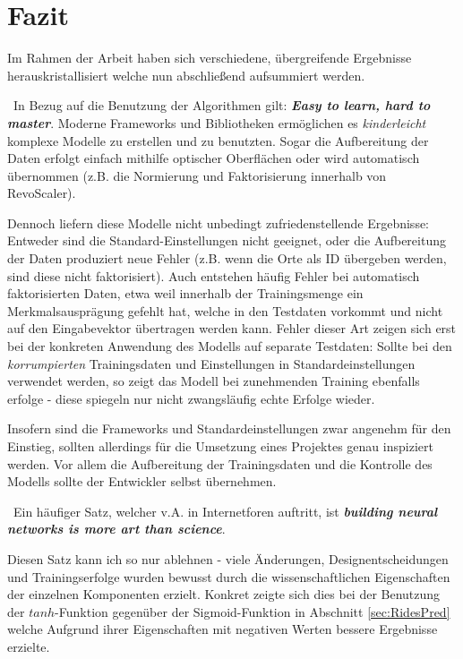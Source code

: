 \chapter{Fazit}
\label{cha:Fazit} \label{cha:Schluss}
Im Rahmen der Arbeit haben sich verschiedene, übergreifende Ergebnisse herauskristallisiert welche nun abschließend aufsummiert werden.

~\newline In Bezug auf die Benutzung der Algorithmen gilt: \textit{\textbf{Easy to learn, hard to master}}. Moderne Frameworks und Bibliotheken ermöglichen es \textit{kinderleicht} komplexe Modelle zu erstellen und zu benutzten. Sogar die Aufbereitung der Daten erfolgt einfach mithilfe optischer Oberflächen oder wird automatisch übernommen (z.B. die Normierung und Faktorisierung innerhalb von RevoScaler).

Dennoch liefern diese Modelle nicht unbedingt zufriedenstellende Ergebnisse: Entweder sind die Standard-Einstellungen nicht geeignet, oder die Aufbereitung der Daten produziert neue Fehler (z.B. wenn die Orte als ID übergeben werden, sind diese nicht faktorisiert). Auch entstehen häufig Fehler bei automatisch faktorisierten Daten, etwa weil innerhalb der Trainingsmenge ein Merkmalsausprägung gefehlt hat, welche in den Testdaten vorkommt und nicht auf den Eingabevektor übertragen werden kann. Fehler dieser Art zeigen sich erst bei der konkreten Anwendung des Modells auf separate Testdaten: Sollte bei den \textit{korrumpierten} Trainingsdaten und Einstellungen in Standardeinstellungen verwendet werden, so zeigt das Modell bei zunehmenden Training ebenfalls erfolge - diese spiegeln nur nicht zwangsläufig echte Erfolge wieder.

Insofern sind die Frameworks und Standardeinstellungen zwar angenehm für den Einstieg, sollten allerdings für die Umsetzung eines Projektes genau inspiziert werden. Vor allem die Aufbereitung der Trainingsdaten und die Kontrolle des Modells sollte der Entwickler selbst übernehmen.  

~\newline Ein häufiger Satz, welcher v.A. in Internetforen auftritt, ist \textit{\textbf{building neural networks is more art than science}}.

Diesen Satz kann ich so nur ablehnen - viele Änderungen, Designentscheidungen und Trainingserfolge wurden bewusst durch die wissenschaftlichen Eigenschaften der einzelnen Komponenten erzielt. Konkret zeigte sich dies bei der Benutzung der $tanh$-Funktion gegenüber der Sigmoid-Funktion in Abschnitt \ref{sec:RidesPred} welche Aufgrund ihrer Eigenschaften mit negativen Werten bessere Ergebnisse erzielte. 

